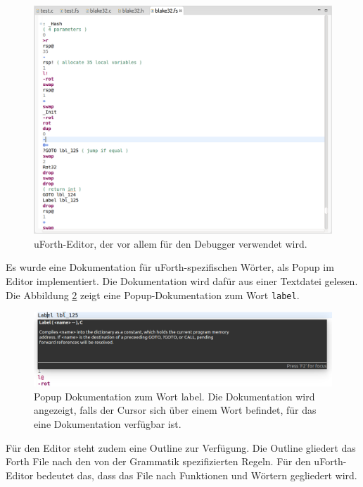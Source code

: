 \begin{figure}[H]
	\centering
		\includegraphics[scale=0.4]{fortheditor/fortheditor.png}
		\caption{uForth-Editor, der vor allem für den Debugger verwendet wird.}
		\label{fig:fortheditor}
\end{figure}

\newpage


Es wurde eine Dokumentation für uForth-spezifischen Wörter, als Popup im Editor implementiert. Die Dokumentation wird dafür aus einer Textdatei gelesen. Die Abbildung \ref{fig:docpopup} zeigt eine Popup-Dokumentation zum Wort \verb!label!.

\begin{figure}[H]
	\centering
		\includegraphics[scale=0.4]{fortheditor/doc.png}
		\caption{Popup Dokumentation zum Wort label. Die Dokumentation wird angezeigt, falls der Cursor sich über einem Wort befindet, für das eine Dokumentation verfügbar ist.}
		\label{fig:docpopup}
\end{figure}

Für den Editor steht zudem eine Outline zur Verfügung. Die Outline gliedert das Forth File nach den von der Grammatik spezifizierten Regeln. Für den uForth-Editor bedeutet das, dass das File nach Funktionen und Wörtern gegliedert wird.

